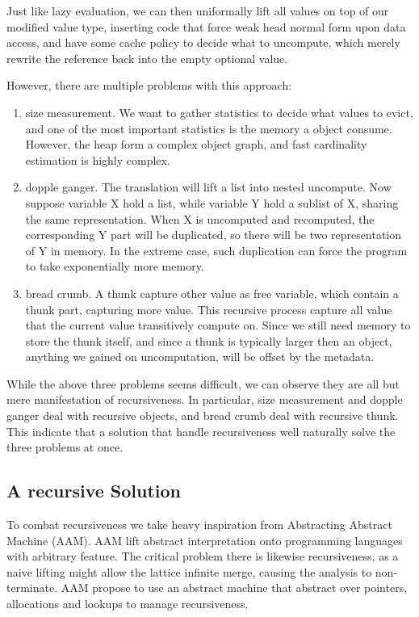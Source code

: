 Just like lazy evaluation, we can then uniformally lift all values on top of our modified value type, inserting code that force weak head normal form upon data access, and have some cache policy to decide what to uncompute, which merely rewrite the reference back into the empty optional value.

However, there are multiple problems with this approach:
\begin{enumerate}
	\item size measurement. We want to gather statistics to decide what values to evict, and one of the most important statistics is the memory a object consume. However, the heap form a complex object graph, and fast cardinality estimation is highly complex.
	\item dopple ganger. The translation will lift a list into nested uncompute. Now suppose variable X hold a list, while variable Y hold a sublist of X, sharing the same representation. When X is uncomputed and recomputed, the corresponding Y part will be duplicated, so there will be two representation of Y in memory. In the extreme case, such duplication can force the program to take exponentially more memory. 
	\item bread crumb. A thunk capture other value as free variable, which contain a thunk part, capturing more value. This recursive process capture all value that the current value transitively compute on. Since we still need memory to store the thunk itself, and since a thunk is typically larger then an object, anything we gained on uncomputation, will be offset by the metadata.
\end{enumerate}

While the above three problems seems difficult, we can observe they are all but mere manifestation of recursiveness. In particular, size measurement and dopple ganger deal with recursive objects, and bread crumb deal with recursive thunk. This indicate that a solution that handle recursiveness well naturally solve the three problems at once.

\subsection{A recursive Solution}
To combat recursiveness we take heavy inspiration from Abstracting Abstract Machine (AAM). AAM lift abstract interpretation onto programming languages with arbitrary feature. The critical problem there is likewise recursiveness, as a naive lifting might allow the lattice infinite merge, causing the analysis to non-terminate. AAM propose to use an abstract machine that abstract over pointers, allocations and lookups to manage recursiveness.


